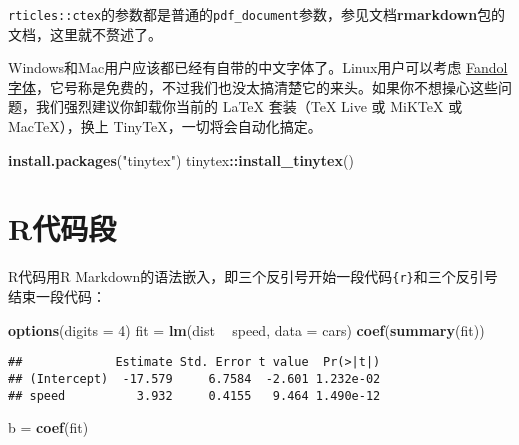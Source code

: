\documentclass[hyperref,]{ctexart}
\newenvironment{Shaded}{\begin{snugshade}}{\end{snugshade}}
\newcommand{\DataTypeTok}[1]{\textcolor[rgb]{0.13,0.29,0.53}{#1}}
\newcommand{\DecValTok}[1]{\textcolor[rgb]{0.00,0.00,0.81}{#1}}
\newcommand{\KeywordTok}[1]{\textcolor[rgb]{0.13,0.29,0.53}{\textbf{#1}}}
\newcommand{\NormalTok}[1]{#1}
\newcommand{\OperatorTok}[1]{\textcolor[rgb]{0.81,0.36,0.00}{\textbf{#1}}}
\newcommand{\StringTok}[1]{\textcolor[rgb]{0.31,0.60,0.02}{#1}}
\begin{document}
\texttt{rticles::ctex}的参数都是普通的\texttt{pdf\_document}参数，参见文档\textbf{rmarkdown}包的文档，这里就不赘述了。

Windows和Mac用户应该都已经有自带的中文字体了。Linux用户可以考虑
\href{http://ctan.org/pkg/fandol}{Fandol字体}，它号称是免费的，不过我们也没太搞清楚它的来头。如果你不想操心这些问题，我们强烈建议你卸载你当前的
LaTeX 套装（TeX Live 或 MiKTeX 或 MacTeX），换上
TinyTeX，一切将会自动化搞定。

\begin{Shaded}
\begin{Highlighting}[]
\KeywordTok{install.packages}\NormalTok{(}\StringTok{"tinytex"}\NormalTok{)}
\NormalTok{tinytex}\OperatorTok{::}\KeywordTok{install_tinytex}\NormalTok{()}
\end{Highlighting}
\end{Shaded}

\hypertarget{rux4ee3ux7801ux6bb5}{%
\section{R代码段}\label{rux4ee3ux7801ux6bb5}}

R代码用R
Markdown的语法嵌入，即三个反引号开始一段代码\texttt{\textasciigrave{}\textasciigrave{}\textasciigrave{}\{r\}}和三个反引号\texttt{\textasciigrave{}\textasciigrave{}\textasciigrave{}}
结束一段代码：

\begin{Shaded}
\begin{Highlighting}[]
\KeywordTok{options}\NormalTok{(}\DataTypeTok{digits =} \DecValTok{4}\NormalTok{)}
\NormalTok{fit =}\StringTok{ }\KeywordTok{lm}\NormalTok{(dist }\OperatorTok{~}\StringTok{ }\NormalTok{speed, }\DataTypeTok{data =}\NormalTok{ cars)}
\KeywordTok{coef}\NormalTok{(}\KeywordTok{summary}\NormalTok{(fit))}
\end{Highlighting}
\end{Shaded}

\begin{verbatim}
##             Estimate Std. Error t value  Pr(>|t|)
## (Intercept)  -17.579     6.7584  -2.601 1.232e-02
## speed          3.932     0.4155   9.464 1.490e-12
\end{verbatim}

\begin{Shaded}
\begin{Highlighting}[]
\NormalTok{b =}\StringTok{ }\KeywordTok{coef}\NormalTok{(fit)}
\end{Highlighting}
\end{Shaded}
\end{document}
